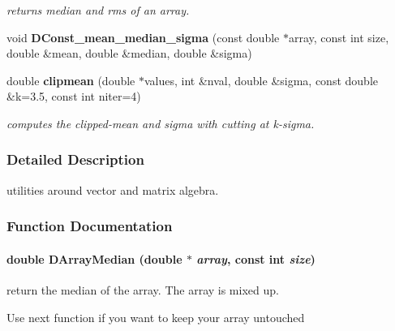\begin{CompactItemize}
\begin{CompactList}\small\item\em returns median and rms of an array.\item\end{CompactList}\item 
{}
void {\bf DConst\_\-mean\_\-median\_\-sigma} (const double $\ast$array, const int size, double \&mean, double \&median, double \&sigma)\label{vutils_h_a12}

\item 
{}
double {\bf clipmean} (double $\ast$values, int \&nval, double \&sigma, const double \&k=3.5, const int niter=4)\label{vutils_h_a13}

\begin{CompactList}\small\item\em computes the clipped-mean and sigma with cutting at k-sigma.\item\end{CompactList}\end{CompactItemize}


\subsubsection{Detailed Description}
utilities around vector and matrix algebra.





\subsubsection{Function Documentation}
\paragraph{\setlength{\rightskip}{0pt plus 5cm}double DArray\-Median (double $\ast$ {\em array}, const int {\em size})}\hfill\label{vutils_h_a1}


return the median of the array. The array is mixed up.

Use next function if you want to keep your array untouched 

